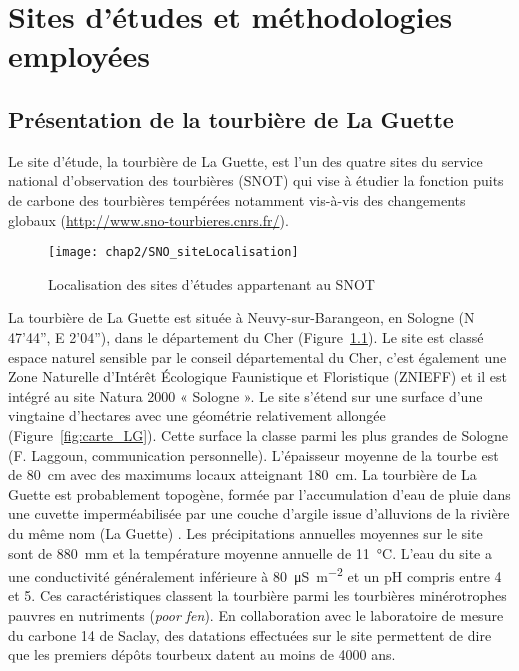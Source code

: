 \singlespacing
\chapter{Sites d'études et méthodologies employées}
\label{ch:ch2}

\minitoc

\newpage
\doublespacing
\section{Présentation de la tourbière de La Guette}

Le site d'étude, la tourbière de La Guette, est l'un des quatre sites du service national d'observation des tourbières (SNOT) qui vise à étudier la fonction puits de carbone des tourbières tempérées notamment vis-à-vis des changements globaux (\url{http://www.sno-tourbieres.cnrs.fr/}).

\begin{figure}[h]
\centering
\texttt{[image: chap2/SNO\_siteLocalisation]}
\caption{Localisation des sites d'études appartenant au SNOT}
\label{fig:carte_europe}
\end{figure}

La tourbière de La Guette est située à Neuvy-sur-Barangeon, en Sologne (N 47’44”, E 2’04”), dans le département du Cher (Figure~\ref{fig:carte_europe}).
Le site est classé espace naturel sensible par le conseil départemental du Cher, c'est également une Zone Naturelle d'Intérêt Écologique Faunistique et Floristique (ZNIEFF) et il est intégré au site Natura 2000 « Sologne ».
Le site s'étend sur une surface d'une vingtaine d'hectares avec une géométrie relativement allongée (Figure~\ref{fig:carte_LG}).
Cette surface la classe parmi les plus grandes de Sologne (F. Laggoun, communication personnelle).
L'épaisseur moyenne de la tourbe est de \SI{80}{\centi\metre} avec des maximums locaux atteignant \SI{180}{\centi\metre}.
La tourbière de La Guette est probablement topogène, formée par l'accumulation d'eau de pluie dans une cuvette imperméabilisée par une couche d'argile issue d'alluvions de la rivière du même nom (La Guette) \plop.
Les précipitations annuelles moyennes sur le site sont de \SI{880}{\milli\metre} et la température moyenne annuelle de \SI{11}{\degreeCelsius}.
L'eau du site a une conductivité généralement inférieure à \SI{80}{\micro\siemens\per\square\metre} et un pH compris entre 4 et 5.
Ces caractéristiques classent la tourbière parmi les tourbières minérotrophes pauvres en nutriments (\textit{poor fen}).
En collaboration avec le laboratoire de mesure du carbone 14 de Saclay, des datations effectuées sur le site permettent de dire que les premiers dépôts tourbeux datent au moins de \num{4000} ans.

